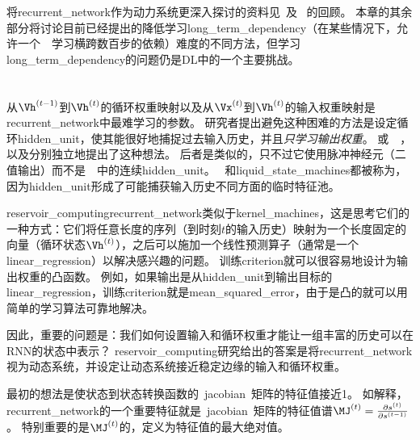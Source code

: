 将\gls{recurrent_network}作为动力系统更深入探讨的资料见~\cite{Doya93,Bengio1994ITNN,Siegelmann+Sontag-1995}及~
\cite{Pascanu-et-al-ICML2013}的回顾。
本章的其余部分将讨论目前已经提出的降低学习\gls{long_term_dependency}（在某些情况下，允许一个~~学习横跨数百步的依赖）难度的不同方法，但学习\gls{long_term_dependency}的问题仍是\gls{DL}中的一个主要挑战。


\section{}
\label{sec:echo_state_networks}
从$\Vh^{(t-1)}$到$\Vh^{(t)}$的循环权重映射以及从$\Vx^{(t)}$到$\Vh^{(t)}$的输入权重映射是\gls{recurrent_network}中最难学习的参数。
研究者\citep{Jaeger-NIPS2002,Maass-et-al-2002,Jaeger+Haas-2004,Jaeger-2007}提出避免这种困难的方法是设定循环\gls{hidden_unit}，使其能很好地捕捉过去输入历史，并且\emph{只学习输出权重}。
或~~\citep{Jaeger+Haas-2004,Jaeger-2007}，以及\citep{Maass-et-al-2002}分别独立地提出了这种想法。
后者是类似的，只不过它使用脉冲神经元（二值输出）而不是~~中的连续\gls{hidden_unit}。
~和\gls{liquid_state_machines}都被称为\citep{Lukosevicius+Jaeger-2009}，因为\gls{hidden_unit}形成了可能捕获输入历史不同方面的临时特征池。


\gls{reservoir_computing}\gls{recurrent_network}类似于\gls{kernel_machines}，这是思考它们的一种方式：它们将任意长度的序列（到时刻$t$的输入历史）映射为一个长度固定的向量（循环状态$\Vh^{(t)}$），之后可以施加一个线性预测算子（通常是一个\gls{linear_regression}）以解决感兴趣的问题。
训练\gls{criterion}就可以很容易地设计为输出权重的凸函数。
例如，如果输出是从\gls{hidden_unit}到输出目标的\gls{linear_regression}，训练\gls{criterion}就是\gls{mean_squared_error}，由于是凸的就可以用简单的学习算法可靠地解决\citep{Jaeger-NIPS2002}。

因此，重要的问题是：我们如何设置输入和循环权重才能让一组丰富的历史可以在\gls{RNN}的状态中表示？
\gls{reservoir_computing}研究给出的答案是将\gls{recurrent_network}视为动态系统，并设定让动态系统接近稳定边缘的输入和循环权重。

最初的想法是使状态到状态转换函数的~\gls{jacobian}~矩阵的特征值接近1。
如解释，\gls{recurrent_network}的一个重要特征就是~\gls{jacobian}~矩阵的特征值谱$\MJ^{(t)} = \frac{\partial s^{(t)}}{\partial s^{(t-1)}}$。
特别重要的是$\MJ^{(t)}$的，定义为特征值的最大绝对值。

